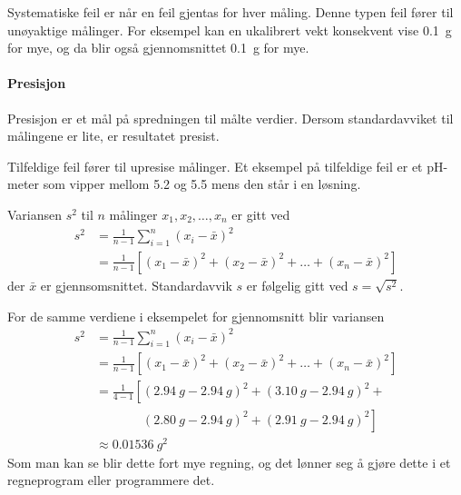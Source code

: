 \documentclass[hidelinks,12pt,norsk,a4paper,fleqn]{scrartcl}
\begin{document}
	Systematiske feil er når en feil gjentas for hver måling. Denne typen feil fører til unøyaktige målinger. For eksempel kan en ukalibrert vekt konsekvent vise \SI{0.1}{g} for mye, og da blir også gjennomsnittet \SI{0.1}{g} for mye.
	
	\begin{comment}
		\tikzstyle{every picture}+=[remember picture]
		\everymath{\displaystyle}
		\begin{equation*}
		\bar{x}=\frac{1}{n}\sum_{
		\tikz[baseline]{
		\node[anchor=base, inner sep=0] (idx)
		{$\scriptstyle i$};
		}=
		\tikz[baseline]{
		\node[anchor=base, inner sep=0] (idxs)
		{$\scriptstyle 1$};
		}
		}^{
		\tikz[baseline]{
		\node[anchor=base, inner sep=0] (idxe)
		{$\scriptstyle n$};
		}
		}
		\tikz[baseline]{
		\node[anchor=base, inner sep=0] (ele)
		{$x_i$};
		}
		\tikz[overlay]{
		\draw [->] (idx.south) to +(0,-.5) to +(-.5,-.5) node[left] {indeksvariabel};
		\draw [->] (idxs.south) to +(0,-.5) to +(.5,-.5) node[right]{startindeks};
		\draw [->] (idxe.north) to +(0,.5) to +(.5,.5) node[right]{sluttindeks};
		\draw [->] (ele.east) to +(.5,0) node[right]{uttrykk som summeres};
		\useasboundingbox (-5,2) rectangle (6,-2);
		}
		\end{equation*}
	\end{comment}
	
	\paragraph{Presisjon}
	Presisjon er et mål på spredningen til målte verdier. Dersom standardavviket til målingene er lite, er resultatet presist.
	
	Tilfeldige feil fører til upresise målinger. Et eksempel på tilfeldige feil er et pH-meter som vipper mellom \num{5.2} og \num{5.5} mens den står i en løsning.
	
	Variansen $s^2$ til $n$ målinger $x_1, x_2, \ldots, x_n$ er gitt ved
	\begin{align*}
		s^2 &= \frac{1}{n-1}\sum_{i=1}^{n}(x_i - \bar{x})^2 \\
		&=\frac{1}{n-1}\left[(x_1-\bar{x})^2 + (x_2-\bar{x})^2 + \dots + (x_n-\bar{x})^2\right]
	\end{align*}
	der $\bar{x}$ er gjennsomsnittet. Standardavvik $s$ er følgelig gitt ved	$s=\sqrt{s^2}$.

	For de samme verdiene i eksempelet for gjennomsnitt blir variansen
	\begin{align*}
		s^2 &= \frac{1}{n-1}\sum_{i=1}^{n}(x_i - \bar{x})^2 \\
		&=\frac{1}{n-1}\left[(x_1-\bar{x})^2 + (x_2-\bar{x})^2 + \dots + (x_n-\bar{x})^2\right]\\
		&=\frac{1}{4-1}\left[(\SI{2.94}{g}-\SI{2.94}{g})^2 + ( \SI{3.10}{g}-\SI{2.94}{g})^2\right. + \\
		&\phantom{=\frac{1}{4-1}\left[\right.}\left.  (\SI{2.80}{g}-\SI{2.94}{g})^2 + (\SI{2.91}{g}-\SI{2.94}{g})^2\right]\\
		&\approx \SI{0.01536}{g^2}
	\end{align*}
	Som man kan se blir dette fort mye regning, og det lønner seg å gjøre dette i et regneprogram eller programmere det.
	
\end{document}
